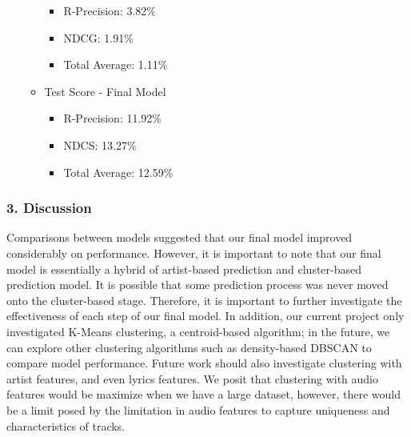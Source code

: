 \documentclass[11pt]{article}
\providecommand{\tightlist}{%
      \setlength{\itemsep}{0pt}\setlength{\parskip}{0pt}}
\begin{document}
\begin{itemize}
\begin{itemize}
    \begin{itemize}
    \tightlist
    \item
      R-Precision: 3.82\%
    \item
      NDCG: 1.91\%
    \item
      Total Average: 1.11\%
    \end{itemize}
  \item
    Test Score - Final Model

    \begin{itemize}
    \tightlist
    \item
      R-Precision: 11.92\%
    \item
      NDCS: 13.27\%
    \item
      Total Average: 12.59\%
    \end{itemize}
  \end{itemize}
\end{itemize}

    \subsubsection{3. Discussion}\label{discussion}

    Comparisons between models suggested that our final model improved
considerably on performance. However, it is important to note that our
final model is essentially a hybrid of artist-based prediction and
cluster-based prediction model. It is possible that some prediction
process was never moved onto the cluster-based stage. Therefore, it is
important to further investigate the effectiveness of each step of our
final model. In addition, our current project only investigated K-Means
clustering, a centroid-based algorithm; in the future, we can explore
other clustering algorithms such as density-based DBSCAN to compare
model performance. Future work should also investigate clustering with
artist features, and even lyrics features. We posit that clustering with
audio features would be maximize when we have a large dataset, however,
there would be a limit posed by the limitation in audio features to
capture uniqueness and characteristics of tracks.


    
    
    
    
\end{document}
